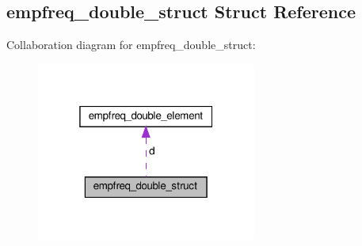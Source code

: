 \hypertarget{structempfreq__double__struct}{}\subsection{empfreq\+\_\+double\+\_\+struct Struct Reference}
\label{structempfreq__double__struct}


Collaboration diagram for empfreq\+\_\+double\+\_\+struct\+:\nopagebreak
\begin{figure}[H]
\begin{center}
\leavevmode
\includegraphics[width=205pt]{structempfreq__double__struct__coll__graph}
\end{center}
\end{figure}
